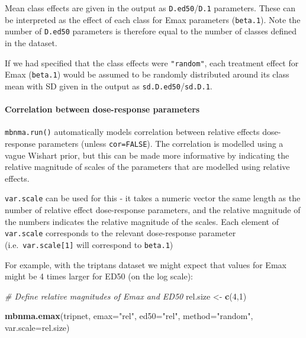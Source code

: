 \documentclass[]{article}
\newenvironment{Shaded}{\begin{snugshade}}{\end{snugshade}}
\newcommand{\CommentTok}[1]{\textcolor[rgb]{0.56,0.35,0.01}{\textit{#1}}}
\newcommand{\DataTypeTok}[1]{\textcolor[rgb]{0.13,0.29,0.53}{#1}}
\newcommand{\DecValTok}[1]{\textcolor[rgb]{0.00,0.00,0.81}{#1}}
\newcommand{\KeywordTok}[1]{\textcolor[rgb]{0.13,0.29,0.53}{\textbf{#1}}}
\newcommand{\NormalTok}[1]{#1}
\newcommand{\StringTok}[1]{\textcolor[rgb]{0.31,0.60,0.02}{#1}}
\let\oldparagraph\paragraph
\renewcommand{\paragraph}[1]{\oldparagraph{#1}\mbox{}}
\begin{document}
Mean class effects are given in the output as
\texttt{D.ed50}/\texttt{D.1} parameters. These can be interpreted as the
effect of each class for Emax parameters (\texttt{beta.1}). Note the
number of \texttt{D.ed50} parameters is therefore equal to the number of
classes defined in the dataset.

If we had specified that the class effects were \texttt{"random"}, each
treatment effect for Emax (\texttt{beta.1}) would be assumed to be
randomly distributed around its class mean with SD given in the output
as \texttt{sd.D.ed50}/\texttt{sd.D.1}.

\hypertarget{correlation-between-dose-response-parameters}{%
\paragraph{Correlation between dose-response
parameters}\label{correlation-between-dose-response-parameters}}

\texttt{mbnma.run()} automatically models correlation between relative
effects dose-response parameters (unless \texttt{cor=FALSE}). The
correlation is modelled using a vague Wishart prior, but this can be
made more informative by indicating the relative magnitude of scales of
the parameters that are modelled using relative effects.

\texttt{var.scale} can be used for this - it takes a numeric vector the
same length as the number of relative effect dose-response parameters,
and the relative magnitude of the numbers indicates the relative
magnitude of the scales. Each element of \texttt{var.scale} corresponds
to the relevant dose-response parameter (i.e.~\texttt{var.scale{[}1{]}}
will correspond to \texttt{beta.1})

For example, with the triptans dataset we might expect that values for
Emax might be 4 times larger for ED50 (on the log scale):

\begin{Shaded}
\begin{Highlighting}[]
\CommentTok{# Define relative magnitudes of Emax and ED50}
\NormalTok{rel.size <-}\StringTok{ }\KeywordTok{c}\NormalTok{(}\DecValTok{4}\NormalTok{,}\DecValTok{1}\NormalTok{)}

\KeywordTok{mbnma.emax}\NormalTok{(tripnet, }\DataTypeTok{emax=}\StringTok{"rel"}\NormalTok{, }\DataTypeTok{ed50=}\StringTok{"rel"}\NormalTok{, }\DataTypeTok{method=}\StringTok{"random"}\NormalTok{, }
           \DataTypeTok{var.scale=}\NormalTok{rel.size)}
\end{Highlighting}
\end{Shaded}
\end{document}
